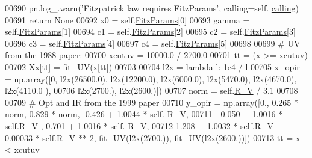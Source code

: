 \begin{DoxyVerb}
\begin{DoxyCode}
00690             pn.log\_.warn(\textcolor{stringliteral}{'Fitzpatrick law requires FitzParams'}, calling=self.
      \hyperlink{classpyneb_1_1extinction_1_1red__corr_1_1_red_corr_a30606dfd94b4cefefd10dbb1f7cbd473}{calling})
00691             \textcolor{keywordflow}{return} \textcolor{keywordtype}{None}
00692         x0 = self.\hyperlink{classpyneb_1_1extinction_1_1red__corr_1_1_red_corr_a133fcc7513d358e629266b24cbe7bebc}{FitzParams}[0]
00693         gamma = self.\hyperlink{classpyneb_1_1extinction_1_1red__corr_1_1_red_corr_a133fcc7513d358e629266b24cbe7bebc}{FitzParams}[1]
00694         c1 = self.\hyperlink{classpyneb_1_1extinction_1_1red__corr_1_1_red_corr_a133fcc7513d358e629266b24cbe7bebc}{FitzParams}[2]
00695         c2 = self.\hyperlink{classpyneb_1_1extinction_1_1red__corr_1_1_red_corr_a133fcc7513d358e629266b24cbe7bebc}{FitzParams}[3]
00696         c3 = self.\hyperlink{classpyneb_1_1extinction_1_1red__corr_1_1_red_corr_a133fcc7513d358e629266b24cbe7bebc}{FitzParams}[4]
00697         c4 = self.\hyperlink{classpyneb_1_1extinction_1_1red__corr_1_1_red_corr_a133fcc7513d358e629266b24cbe7bebc}{FitzParams}[5]
00698         
00699         \textcolor{comment}{# UV from the 1988 paper:}
00700         xcutuv = 10000.0 / 2700.0
00701         tt = (x >= xcutuv) 
00702         Xx[tt] = fit\_UV(x[tt])
00703         
00704         l2x = \textcolor{keyword}{lambda} l: 1e4 / l
00705         x\_opir = np.array([0, l2x(26500.0), l2x(12200.0), l2x(6000.0), l2x(5470.0), l2x(4670.0), l2x(4110.0
      ),
00706                   l2x(2700.), l2x(2600.)])
00707         norm = self.\hyperlink{classpyneb_1_1extinction_1_1red__corr_1_1_red_corr_a4696ecdd84c912c20e6aa19b1573e875}{R\_V} / 3.1
00708 
00709         \textcolor{comment}{# Opt and IR from the 1999 paper}
00710         y\_opir = np.array([0., 0.265 * norm, 0.829 * norm, -0.426 + 1.0044 * self.
      \hyperlink{classpyneb_1_1extinction_1_1red__corr_1_1_red_corr_a4696ecdd84c912c20e6aa19b1573e875}{R\_V},
00711                            - 0.050 + 1.0016 * self.\hyperlink{classpyneb_1_1extinction_1_1red__corr_1_1_red_corr_a4696ecdd84c912c20e6aa19b1573e875}{R\_V} , 0.701 + 1.0016 * self.
      \hyperlink{classpyneb_1_1extinction_1_1red__corr_1_1_red_corr_a4696ecdd84c912c20e6aa19b1573e875}{R\_V},
00712                            1.208 + 1.0032 * self.\hyperlink{classpyneb_1_1extinction_1_1red__corr_1_1_red_corr_a4696ecdd84c912c20e6aa19b1573e875}{R\_V} - 0.00033 * self.\hyperlink{classpyneb_1_1extinction_1_1red__corr_1_1_red_corr_a4696ecdd84c912c20e6aa19b1573e875}{R\_V} ** 2, fit\_UV(l2x(2700.)), 
      fit\_UV(l2x(2600.))])
00713         tt = x < xcutuv

\end{DoxyCode}
\end{DoxyVerb}
